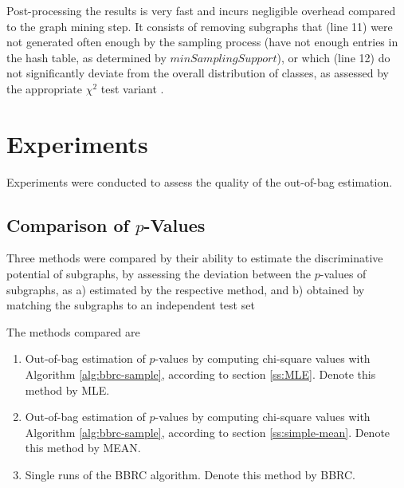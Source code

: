\documentclass{article}
\begin{document}
Post-processing the results is very fast and incurs negligible overhead
compared to the graph mining step. It consists of removing subgraphs that (line
11) were not generated often enough by the sampling process (have not enough
entries in the hash table, as determined by $minSamplingSupport$), or which
(line 12) do not significantly deviate from the overall distribution of classes,
as assessed by the appropriate $\chi^2$ test variant .


\section{Experiments}
\label{s:Experiments}
Experiments were conducted to assess the quality of the out-of-bag estimation.

\subsection{Comparison of $p$-Values} Three methods were compared by their
ability to estimate the discriminative potential of subgraphs, by assessing the
deviation between the $p$-values of subgraphs, as a) estimated by the
respective method, and b) obtained by matching the subgraphs to an independent
test set

The methods compared are

\begin{enumerate}
  \item{Out-of-bag estimation of $p$-values by computing chi-square values with Algorithm \ref{alg:bbrc-sample}, according to section \ref{ss:MLE}. Denote this method by MLE.}
  \item{Out-of-bag estimation of $p$-values by computing chi-square values with Algorithm \ref{alg:bbrc-sample}, according to section \ref{ss:simple-mean}. Denote this method by MEAN.}
  \item{Single runs of the BBRC algorithm. Denote this method by BBRC.} 
\end{enumerate}
\end{document}
